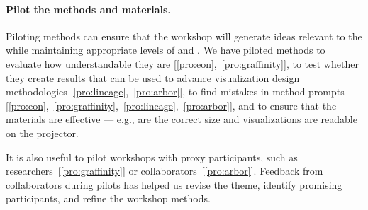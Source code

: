 \paragraph{Pilot the methods and materials.} Piloting methods can ensure that the workshop will generate ideas relevant to the \topic while maintaining appropriate levels of \interest and \challenge. We have piloted methods to evaluate how understandable they are [\ref{pro:eon},~\ref{pro:graffinity}], to test whether they create results that can be used to advance visualization design methodologies [\ref{pro:lineage},~\ref{pro:arbor}], to find mistakes in method prompts [\ref{pro:eon},~\ref{pro:graffinity},~\ref{pro:lineage},~\ref{pro:arbor}], and to ensure that the materials are effective --- e.g., \stickyNotes are the correct size and visualizations are readable on the projector.

It is also useful to pilot workshops with proxy participants, such as researchers~[\ref{pro:graffinity}] or collaborators~[\ref{pro:arbor}]. Feedback from collaborators during pilots has helped us revise the theme, identify promising participants, and refine the workshop methods.
